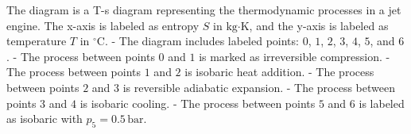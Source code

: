 The diagram is a T-s diagram representing the thermodynamic processes in a jet engine. The x-axis is labeled as entropy \( S \) in \( \text{kg·K} \), and the y-axis is labeled as temperature \( T \) in \( ^\circ\text{C} \).  
- The diagram includes labeled points: \( 0 \), \( 1 \), \( 2 \), \( 3 \), \( 4 \), \( 5 \), and \( 6 \).  
- The process between points \( 0 \) and \( 1 \) is marked as irreversible compression.  
- The process between points \( 1 \) and \( 2 \) is isobaric heat addition.  
- The process between points \( 2 \) and \( 3 \) is reversible adiabatic expansion.  
- The process between points \( 3 \) and \( 4 \) is isobaric cooling.  
- The process between points \( 5 \) and \( 6 \) is labeled as isobaric with \( p_5 = 0.5 \, \text{bar} \).